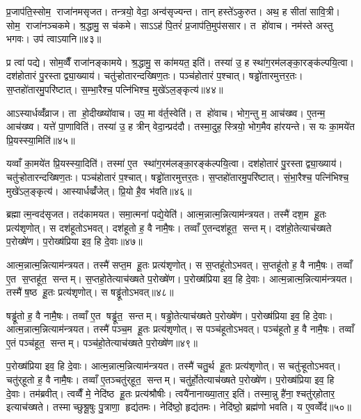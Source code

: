
प्र॒जाप॑ति॒स्सोम॒ राजा॑नमसृजत। तन्त्रयो॒ वेदा॒ अन्व॑सृज्यन्त। तान् हस्ते॑ऽकुरुत। अथ॒ ह सीता॑ सावि॒त्री। सोम॒ राजा॑नञ्चकमे। श्र॒द्धामु॒ स च॑कमे। साऽऽह॑ पि॒तरं॑ प्र॒जाप॑ति॒मुप॑ससार। त हो॑वाच। नम॑स्ते अस्तु भगवः। उप॑ त्वाऽयानि॥४३॥

प्र त्वा॑ पद्ये। सोम॒व्वैँ राजा॑नङ्कामये। श्र॒द्धामु॒ स का॑मयत॒ इति॑। तस्या॑ उ॒ ह स्था॑ग॒रम॑लङ्का॒रङ्क॑ल्पयि॒त्वा। दश॑होतारं पु॒रस्ताद्व्या॒ख्याय॑। चतु॑ऱ्होतारन्दख्षिण॒तः। पञ्च॑होतारं प॒श्चात्। षड्ढो॑तारमुत्तर॒तः। स॒प्तहो॑तारमु॒परि॑ष्टात्। स॒म्भा॒रैश्च॒ पत्नि॑भिश्च॒ मुखे॑ऽल॒ङ्कृत्य॑॥४४॥

आऽस्यार्धव्वँ॑व्राज। ता हो॒दीख्ष्यो॑वाच। उप॒ मा व॑र्त॒स्वेति॑। त हो॑वाच। भोग॒न्तु म॒ आच॑ख्ष्व। ए॒तन्म॒ आच॑ख्ष्व। यत्ते॑ पा॒णाविति॑। तस्या॑ उ॒ ह त्रीन् वेदा॒न्प्रद॑दौ। तस्मा॒दुह॒ स्त्रियो॒ भोग॒मैव हा॑रयन्ते। स यः का॒मये॑त प्रि॒यस्स्या॒मिति॑॥४५॥

यव्वाँ का॒मये॑त प्रि॒यस्स्या॒दिति॑। तस्मा॑ ए॒त स्था॑ग॒रम॑लङ्का॒रङ्क॑ल्पयि॒त्वा। दश॑होतारं पु॒रस्ताद्व्या॒ख्याय॑। चतु॑ऱ्होतारन्दख्षिण॒तः। पञ्च॑होतारं प॒श्चात्। षड्ढो॑तारमुत्तर॒तः। स॒प्तहो॑तारमु॒परि॑ष्टात्। सं॒भा॒रैश्च॒ पत्नि॑भिश्च॒ मुखे॑ऽल॒ङ्कृत्य॑। आस्यार्धव्व्रँ॑जेत्। प्रि॒यो है॒व भ॑वति॥४६॥


ब्रह्मात्म॒न्वद॑सृजत। तद॑कामयत। समा॒त्मना॑ पद्ये॒येति॑। आत्म॒न्नात्म॒न्नित्याम॑न्त्रयत। तस्मै॑ दश॒म हू॒तः प्रत्य॑शृणोत्। स दश॑हूतोऽभवत्। दश॑हूतो ह॒ वै नामै॒षः। तव्वाँ ए॒तन्दश॑हूत॒ सन्तम्। दश॑हो॒तेत्याच॑ख्षते प॒रोख्षे॑ण। प॒रोख्ष॑प्रिया इव॒ हि दे॒वाः॥४७॥

आत्म॒न्नात्म॒न्नित्याम॑न्त्रयत। तस्मै॑ सप्त॒म हू॒तः प्रत्य॑शृणोत्। स स॒प्तहू॑तोऽभवत्। स॒प्तहू॑तो ह॒ वै नामै॒षः। तव्वाँ ए॒त स॒प्तहू॑त॒ सन्तम्। स॒प्तहो॒तेत्याच॑ख्षते प॒रोख्षे॑ण। प॒रोख्ष॑प्रिया इव॒ हि दे॒वाः। आत्म॒न्नात्म॒न्नित्याम॑न्त्रयत। तस्मै॑ ष॒ष्ठ हू॒तः प्रत्य॑शृणोत्। स षड्ढू॑तोऽभवत्॥४८॥

षड्ढू॑तो ह॒ वै नामै॒षः। तव्वाँ ए॒त षड्ढू॑त॒ सन्तम्। षड्ढो॒तेत्याच॑ख्षते प॒रोख्षे॑ण। प॒रोख्ष॑प्रिया इव॒ हि दे॒वाः। आत्म॒न्नात्म॒न्नित्याम॑न्त्रयत। तस्मै॑ पञ्च॒म हू॒तः प्रत्य॑शृणोत्। स पञ्च॑हूतोऽभवत्। पञ्च॑हूतो ह॒ वै नामै॒षः। तव्वाँ ए॒तं पञ्च॑हूत॒ सन्तम्। पञ्च॑हो॒तेत्याच॑ख्षते प॒रोख्षे॑ण॥४९॥

प॒रोख्ष॑प्रिया इव॒ हि दे॒वाः। आत्म॒न्नात्म॒न्नित्याम॑न्त्रयत। तस्मै॑ चतु॒र्थ हू॒तः प्रत्य॑शृणोत्। स चतु॑ऱ्हूतोऽभवत्। चतु॑र्‌हूतो ह॒ वै नामै॒षः। तव्वाँ ए॒तञ्चतु॑र्‌हूत॒ सन्तम्। चतु॑र्हो॒तेत्याच॑ख्षते प॒रोख्षे॑ण। प॒रोख्ष॑प्रिया इव॒ हि दे॒वाः। तम॑ब्रवीत्। त्वव्वैँ मे॒ नेदि॑ष्ठ हू॒तः प्रत्य॑श्रौषीः। त्वयै॑नानाख्या॒तार॒ इति॑। तस्मा॒न्नु है॑ना॒श्चतु॑र्‌होतार॒ इत्याच॑ख्षते। तस्माच्छुश्रू॒षुः पु॒त्राणा॒ हृद्य॑तमः। नेदि॑ष्ठो॒ हृद्य॑तमः। नेदि॑ष्ठो॒ ब्रह्म॑णो भवति। य ए॒वव्वेँद॑॥५०॥

